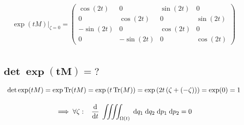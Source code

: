 \documentclass[10pt,a4paper]{article}
\newcommand{\const}[1]{\text{\rmfamily\upshape #1}}
\newcommand{\mat}[1]{
    \begin{pmatrix}
        #1
    \end{pmatrix}
}
\renewcommand{\d}[1]{\;\const{d}#1}
\newcommand{\dd}[2]{\frac{\const{d} #1}{\const{d} #2} \;}
\newcommand{\Tr}{\operatorname{Tr}}
\begin{document}
\begin{gather*}
    \\[25pt]
    \exp(tM) |_{\zeta=0} = \mat{\cos{\left(2 t \right)} & 0 & \sin{\left(2 t \right)} & 0\\0 & \cos{\left(2 t \right)} & 0 & \sin{\left(2 t \right)}\\- \sin{\left(2 t \right)} & 0 & \cos{\left(2 t \right)} & 0\\0 & - \sin{\left(2 t \right)} & 0 & \cos{\left(2 t \right)}}
    \\[25pt]
\end{gather*}

\subsection{
    \texorpdfstring{
        $\pmb{ \det\exp(tM) = \mathit{?} }$
    }{
        det exp(tM) = ?
    }
}
\begin{gather*}
    \det \exp(tM) = \exp \Tr(tM) =
    \exp\left( t \Tr(M) \right) =
    \exp\left( 2t \left(\zeta+(-\zeta)\right) \right) =
    \exp(0) = 1
    \\[10pt]
    \implies
    \forall \zeta:
    \;\;\;
    \dd{}{t}
    \iiiint_{\Omega(t)}
    \d{q_1} \d{q_2} \d{p_1} \d{p_2} = 0
\end{gather*}
\end{document}
